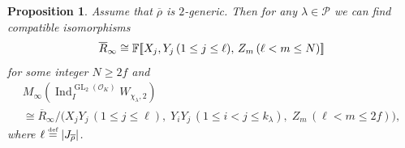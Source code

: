 \documentclass[JEP,XML,SOM,Unicode,NoFloatCountersInSection, NoEqCountersInSection,published]{cedram}
\let\ovl\overline
\newcommand{\defeq}{\stackrel{\textrm{\tiny{\upshape{def}}}}{=}}
\newcommand{\F}{\mathbb{F}}
\newcommand{\cO}{\mathcal{O}}
\renewcommand{\P}{\mathscr P}
\newcommand{\brho}{\overline{\rho}}
\newcommand{\bbra}[1]{[\mkern-3mu[#1]\mkern-3mu]}
\DeclareMathOperator{\GL}{GL}
\DeclareMathOperator{\Ind}{Ind}
\theoremstyle{plain}
\newtheorem{prop}{Proposition}[subsection]
\theoremstyle{definition}
\begin{document}
\begin{prop}\label{prop:patched-module-V_chi-3}
{Assume that $\brho$ is $2$-generic}.
Then for any $\lambda \in \P$ we can find compatible isomorphisms
\begin{equation*}
\ovl R_\infty \cong \F\bbra{X_j, Y_j\, (1 \le j \le \ell),\, Z_m\, (\ell < m \le N)}
\end{equation*}
for some integer $N \ge 2f$ and
\begin{multline*}
M_\infty(\Ind_I^{\GL_2(\cO_K)} W_{\chi_\lambda,2})\\
\cong \ovl R_\infty/\bigl(X_jY_j\, (1 \le j \le \ell),\; Y_i Y_j\, (1 \le i < j \le k_\lambda),\; Z_m\, (\ell < m \le 2f)\bigr),
\end{multline*}
where $\ell \defeq |J_{\brho}|$.
\end{prop}
\end{document}

